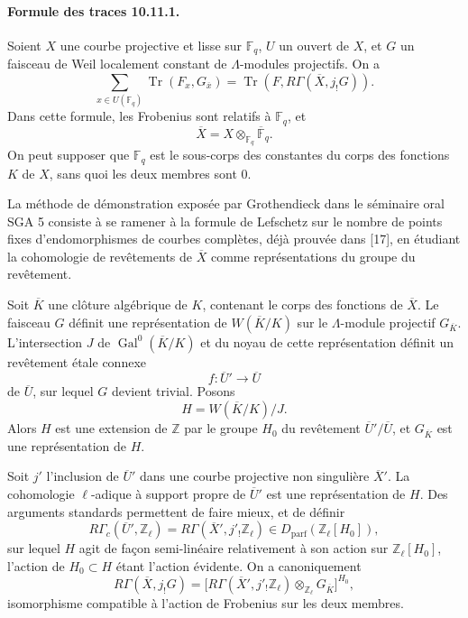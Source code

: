 \documentclass[10pt,letterpaper]{article}
\newcommand{\Z}{\mathbb Z}
\newcommand{\F}{\mathbb F}
\newcommand{\Gal}{\operatorname{Gal}}
\newcommand{\Tr}{\operatorname{Tr}}
\providecommand{\Gal}{\operatorname{Gal}}
\providecommand{\Gal}{\operatorname{Gal}}
\providecommand{\Tr}{\operatorname{Tr}}
\providecommand{\Dparf}{D_{\mathrm{parf}}}
\providecommand{\Gal}{\operatorname{Gal}}
\providecommand{\Tr}{\operatorname{Tr}}
\providecommand{\Gal}{\operatorname{Gal}}
\providecommand{\Tr}{\operatorname{Tr}}
\begin{document}
\paragraph{Formule des traces 10.11.1.} Soient \(X\) une courbe projective et lisse sur \(\F_q\), \(U\) un ouvert de \(X\), et \(G\) un faisceau de Weil localement constant de \(\Lambda\)-modules projectifs. On a
\[
\sum_{x\in U(\F_q)}\Tr(F_x,G_{\overline x})
=
\Tr(F,R\Gamma(\overline X,j_!G)).
\]
Dans cette formule, les Frobenius sont relatifs à \(\F_q\), et
\[
\overline X=X\otimes_{\F_q}\overline{\F}_q.
\]
On peut supposer que \(\F_q\) est le sous-corps des constantes du corps des fonctions \(K\) de \(X\), sans quoi les deux membres sont \(0\).

La méthode de démonstration exposée par Grothendieck dans le séminaire oral SGA 5 consiste à se ramener à la formule de Lefschetz sur le nombre de points fixes d'endomorphismes de courbes complètes, déjà prouvée dans [17], en étudiant la cohomologie de revêtements de \(\overline X\) comme représentations du groupe du revêtement.

Soit \(\overline K\) une clôture algébrique de \(K\), contenant le corps des fonctions de \(\overline X\). Le faisceau \(G\) définit une représentation de \(W(\overline K/K)\) sur le \(\Lambda\)-module projectif \(G_{\overline K}\). L'intersection \(J\) de \(\Gal^0(\overline K/K)\) et du noyau de cette représentation définit un revêtement étale connexe
\[
f:\overline U'\longrightarrow \overline U
\]
de \(\overline U\), sur lequel \(G\) devient trivial. Posons
\[
H=W(\overline K/K)/J.
\]
Alors \(H\) est une extension de \(\Z\) par le groupe \(H_0\) du revêtement \(\overline U'/\overline U\), et \(G_{\overline K}\) est une représentation de \(H\).

Soit \(j'\) l'inclusion de \(\overline U'\) dans une courbe projective non singulière \(\overline X'\). La cohomologie \(\ell\)-adique à support propre de \(\overline U'\) est une représentation de \(H\). Des arguments standards permettent de faire mieux, et de définir
\[
R\Gamma_c(\overline U',\Z_\ell)
=
R\Gamma(\overline X',j'_!\Z_\ell)
\in\Dparf(\Z_\ell[H_0]),
\]
sur lequel \(H\) agit de façon semi-linéaire relativement à son action sur \(\Z_\ell[H_0]\), l'action de \(H_0\subset H\) étant l'action évidente. On a canoniquement
\[
\tag{10.11.2}
R\Gamma(\overline X,j_!G)
=
\bigl[
R\Gamma(\overline X',j'_!\Z_\ell)
\otimes_{\Z_\ell}G_{\overline K}
\bigr]^{H_0},
\]
isomorphisme compatible à l'action de Frobenius sur les deux membres.
\end{document}
